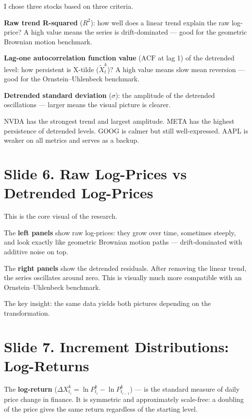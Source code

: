 \documentclass[12pt,a4paper]{article}
\begin{document}
I chose three stocks based on three criteria.

\textbf{Raw trend R-squared} ($R^2$):
how well does a linear trend explain the raw log-price?
A high value means the series is drift-dominated ---
good for the geometric Brownian motion benchmark.

\textbf{Lag-one autocorrelation function value}
($\text{ACF}$ at lag 1) of the detrended level:
how persistent is X-tilde ($\widetilde{X}_t^k$)?
A high value means slow mean reversion ---
good for the Ornstein--Uhlenbeck benchmark.

\textbf{Detrended standard deviation} ($\sigma$):
the amplitude of the detrended oscillations ---
larger means the visual picture is clearer.

NVDA has the strongest trend and largest amplitude.
META has the highest persistence of detrended levels.
GOOG is calmer but still well-expressed.
AAPL is weaker on all metrics and serves as a backup.

\section{Slide 6. Raw Log-Prices vs Detrended Log-Prices}

This is the core visual of the research.

The \textbf{left panels} show raw log-prices:
they grow over time, sometimes steeply,
and look exactly like geometric Brownian motion paths ---
drift-dominated with additive noise on top.

The \textbf{right panels} show the detrended residuals.
After removing the linear trend, the series oscillates around zero.
This is visually much more compatible with an Ornstein--Uhlenbeck benchmark.

The key insight: the same data yields both pictures depending on the transformation.

\section{Slide 7. Increment Distributions: Log-Returns}

The \textbf{log-return} ($\Delta X_{t_i}^k = \ln P_{t_i}^k - \ln P_{t_{i-1}}^k$) ---
is the standard measure of daily price change in finance.
It is symmetric and approximately scale-free:
a doubling of the price gives the same return regardless of the starting level.
\end{document}

